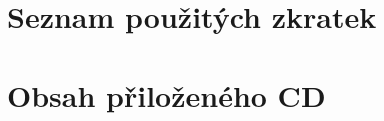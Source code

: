 \documentclass[thesis=B,czech,hidelinks]{dependencies/Thesis}
\begin{document}

\renewcommand{\thefigure}{\arabic{chapter}.\arabic{figure}}
\renewcommand{\figurename}{Obrázek}

\renewcommand{\thetable}{\arabic{chapter}.\arabic{table}}
\renewcommand{\tablename}{Tabulka}

\renewcommand{\thelisting}{\arabic{chapter}.\arabic{listing}}



\begin{introduction}
   
\end{introduction}






\begin{conclusion}
   
\end{conclusion}

\begin{literature}
   \printbibliography[heading=none]
\end{literature}



\appendix

\chapter{Seznam použitých zkratek}
\printglossary[type=\acronymtype,style=acronyms]

\chapter{Obsah přiloženého CD}


\end{document}
